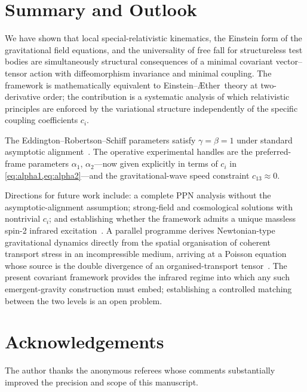 \documentclass[12pt,a4paper]{article}
\newcommand{\Aether}{\AE ther}
\begin{document}
\section{Summary and Outlook}
\label{sec:summary}

We have shown that local special-relativistic kinematics, the Einstein form of
the gravitational field equations, and the universality of free fall for
structureless test bodies are simultaneously structural consequences of a
minimal covariant vector--tensor action with diffeomorphism invariance and
minimal coupling. The framework is mathematically equivalent to
Einstein--\Aether\ theory at two-derivative order; the contribution is a
systematic analysis of which relativistic principles are enforced by the
variational structure independently of the specific coupling coefficients
$c_{i}$.

The Eddington--Robertson--Schiff parameters satisfy $\gamma=\beta=1$ under
standard asymptotic alignment~\citep{foster2006}. The operative experimental
handles are the preferred-frame parameters $\alpha_{1}$, $\alpha_{2}$---now
given explicitly in terms of $c_{i}$ in \cref{eq:alpha1,eq:alpha2}---and the
gravitational-wave speed constraint $c_{13}\approx 0$.

Directions for future work include: a complete PPN analysis without the
asymptotic-alignment assumption; strong-field and cosmological solutions with
nontrivial $c_{i}$; and establishing whether the framework admits a unique
massless spin-2 infrared excitation~\citep{weinberg1972,weinberg1965}.
A parallel programme derives Newtonian-type gravitational dynamics directly
from the spatial organisation of coherent transport stress in an incompressible
medium, arriving at a Poisson equation whose source is the double divergence
of an organised-transport tensor~\citep{iskandarani2026transport}.
The present covariant framework provides the infrared regime into which any
such emergent-gravity construction must embed; establishing a controlled
matching between the two levels is an open problem.

\section*{Acknowledgements}
The author thanks the anonymous referees whose comments substantially improved
the precision and scope of this manuscript.
\end{document}
